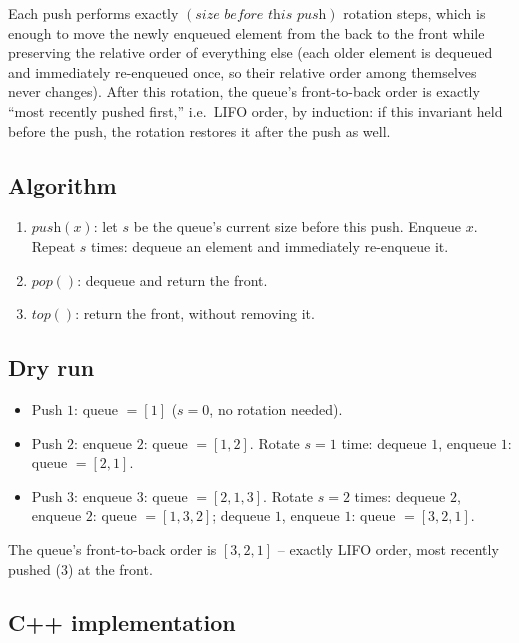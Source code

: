 Each push performs exactly $(\textit{size before this push})$ rotation
steps, which is enough to move the newly enqueued element from the back
to the front while preserving the relative order of everything else
(each older element is dequeued and immediately re-enqueued once, so
their relative order among themselves never changes). After this
rotation, the queue's front-to-back order is exactly ``most recently
pushed first,'' i.e.\ LIFO order, by induction: if this invariant held
before the push, the rotation restores it after the push as well.

\subsection*{Algorithm}

\begin{enumerate}
  \item $\textit{push}(x)$: let $s$ be the queue's current size before
        this push. Enqueue $x$. Repeat $s$ times: dequeue an element and
        immediately re-enqueue it.
  \item $\textit{pop}()$: dequeue and return the front.
  \item $\textit{top}()$: return the front, without removing it.
\end{enumerate}

\subsection*{Dry run}


\begin{itemize}
  \item Push $1$: queue $=[1]$ ($s=0$, no rotation needed).
  \item Push $2$: enqueue $2$: queue $=[1,2]$. Rotate $s=1$ time:
        dequeue $1$, enqueue $1$: queue $=[2,1]$.
  \item Push $3$: enqueue $3$: queue $=[2,1,3]$. Rotate $s=2$ times:
        dequeue $2$, enqueue $2$: queue $=[1,3,2]$; dequeue $1$, enqueue
        $1$: queue $=[3,2,1]$.
\end{itemize}

The queue's front-to-back order is $[3,2,1]$ -- exactly LIFO order, most
recently pushed ($3$) at the front.

\subsection*{C++ implementation}

